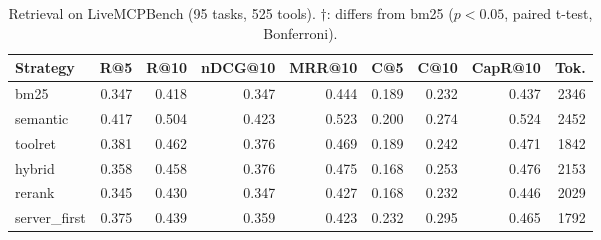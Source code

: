 \begin{table}
\centering
\caption{Retrieval on LiveMCPBench (95 tasks, 525 tools). $\dagger$: differs from bm25 ($p<0.05$, paired t-test, Bonferroni).}
\label{tab:retrieval}
\begin{tabular}{lrrrrrrrr}
\toprule
Strategy & R@5 & R@10 & nDCG@10 & MRR@10 & C@5 & C@10 & CapR@10 & Tok. \\
\midrule
bm25 & 0.347 & 0.418 & 0.347 & 0.444 & 0.189 & 0.232 & 0.437 & 2346 \\
semantic & 0.417 & 0.504 & 0.423 & 0.523 & 0.200 & 0.274 & 0.524 & 2452 \\
toolret & 0.381 & 0.462 & 0.376 & 0.469 & 0.189 & 0.242 & 0.471 & 1842 \\
hybrid & 0.358 & 0.458 & 0.376 & 0.475 & 0.168 & 0.253 & 0.476 & 2153 \\
rerank & 0.345 & 0.430 & 0.347 & 0.427 & 0.168 & 0.232 & 0.446 & 2029 \\
server\_first & 0.375 & 0.439 & 0.359 & 0.423 & 0.232 & 0.295 & 0.465 & 1792 \\
\bottomrule
\end{tabular}
\end{table}
